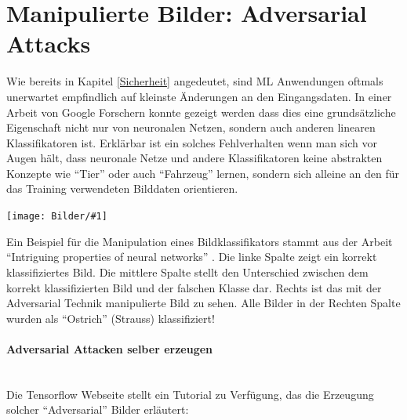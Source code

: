 \documentclass[
  12pt, %
  a4paper, %
  oneside, %
  openany, 
  numbers=noenddot, %
  BCOR=5mm, %
  parskip=half*, %
  thesis, %
]{bfhbook}
\newcommand{\parag}[1]{\paragraph*{#1}\mbox{}\\}
\newcommand{\imgText}[3]{
\begin{center}
    \begin{minipage}[t]{0.6\textwidth}
    		\vspace{0pt}
		\texttt{[image: Bilder/\#1]}
		\captionof{figure}{#2}
	\end{minipage}\hfill
    \begin{minipage}[t]{0.4\textwidth}
    		\vspace{5pt}
  		#3
    \end{minipage}
\end{center}
}
\begin{document}
\section{Manipulierte Bilder: Adversarial Attacks}
\label{Adversarial Attacks}
Wie bereits in Kapitel \ref{Sicherheit} angedeutet, sind \Gls{ML} Anwendungen oftmals unerwartet empfindlich auf kleinste Änderungen an den Eingangsdaten. In einer Arbeit von Google Forschern   \parencite{Goodfellow2014} konnte gezeigt werden dass dies eine grundsätzliche Eigenschaft nicht nur von neuronalen Netzen, sondern auch anderen linearen Klassifikatoren ist. Erklärbar ist ein solches Fehlverhalten wenn man sich vor Augen hält, dass neuronale Netze und andere Klassifikatoren keine abstrakten Konzepte wie ``Tier'' oder auch ``Fahrzeug'' lernen, sondern sich alleine an den für das Training verwendeten Bilddaten orientieren.

\imgText{adversarial.png}{Adversarial Beispiel \protect\footnotemark{}}{
Ein Beispiel für die Manipulation eines Bildklassifikators stammt aus der Arbeit ``Intriguing properties of neural networks'' \parencite{Szegedy2013}. 
\break\break
Die linke Spalte zeigt ein korrekt klassifiziertes Bild.
\break\break
Die mittlere Spalte stellt den Unterschied zwischen dem korrekt klassifizierten Bild und der falschen Klasse dar.
\break\break
Rechts ist das mit der Adversarial Technik manipulierte Bild zu sehen.
\break\break
Alle Bilder in der Rechten Spalte wurden als ``Ostrich'' (Strauss) klassifiziert!
}

\parag{Adversarial Attacken selber erzeugen}
Die Tensorflow Webseite stellt ein Tutorial zu Verfügung, das die Erzeugung solcher ``Adversarial'' Bilder erläutert: \parencite{tensorflowFGSM}
\end{document}
